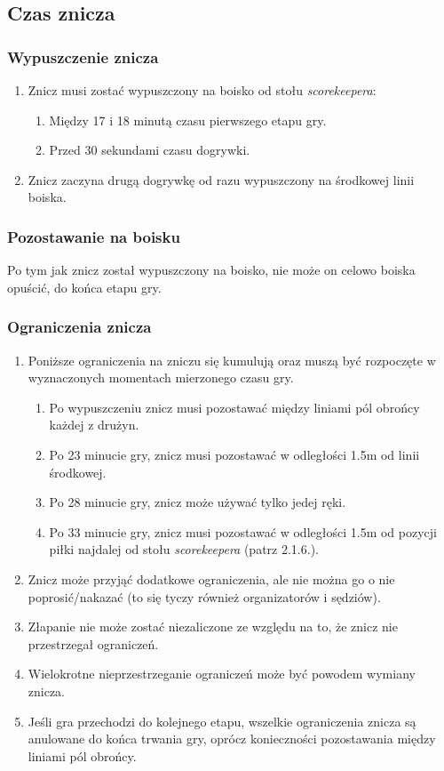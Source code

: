 \documentclass[11pt,a4paper]{article}
\begin{document}
\subsection{Czas znicza}

\subsubsection{Wypuszczenie znicza}
\begin{enumerate}
  \item Znicz musi zostać wypuszczony na boisko od stołu \emph{scorekeepera}:
  \begin{enumerate}
    \item Między 17 i 18 minutą czasu pierwszego etapu gry.
    \item Przed 30 sekundami czasu dogrywki.
  \end{enumerate}
  \item Znicz zaczyna drugą dogrywkę od razu wypuszczony na środkowej linii boiska.
\end{enumerate}

\subsubsection{Pozostawanie na boisku}
Po tym jak znicz został wypuszczony na boisko, nie może on celowo boiska opuścić, do końca etapu gry.

\subsubsection{Ograniczenia znicza}
\begin{enumerate}
  \item Poniższe ograniczenia na zniczu się kumulują oraz muszą być rozpoczęte w wyznaczonych momentach mierzonego czasu gry.
  \begin{enumerate}
    \item Po wypuszczeniu znicz musi pozostawać między liniami pól obrońcy każdej z drużyn.
    \item Po 23 minucie gry, znicz musi pozostawać w odległości 1.5m od linii środkowej.
    \item Po 28 minucie gry, znicz może używać tylko jedej ręki.
    \item Po 33 minucie gry, znicz musi pozostawać w odległości 1.5m od pozycji piłki najdalej od stołu \emph{scorekeepera} (patrz 2.1.6.). %
  \end{enumerate}
  \item Znicz może przyjąć dodatkowe ograniczenia, ale nie można go o nie poprosić/nakazać (to się tyczy również organizatorów i sędziów).
  \item Złapanie nie może zostać niezaliczone ze względu na to, że znicz nie przestrzegał ograniczeń.
  \item Wielokrotne nieprzestrzeganie ograniczeń może być powodem wymiany znicza.
  \item Jeśli gra przechodzi do kolejnego etapu, wszelkie ograniczenia znicza są anulowane do końca trwania gry, oprócz konieczności pozostawania między liniami pól obrońcy.
\end{enumerate}
\end{document}
